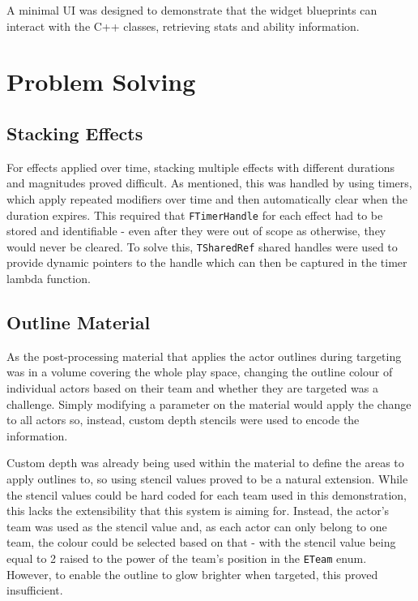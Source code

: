 \documentclass{article}
\begin{document}
A minimal UI was designed to demonstrate that the widget blueprints can interact with the C++ classes, retrieving stats and ability information.

\section{Problem Solving}

\subsection{Stacking Effects}

For effects applied over time, stacking multiple effects with different durations and magnitudes proved difficult. As mentioned, this was handled by using timers, which apply repeated modifiers over time and then automatically clear when the duration expires. This required that \texttt{FTimerHandle} for each effect had to be stored and identifiable - even after they were out of scope as otherwise, they would never be cleared. To solve this, \texttt{TSharedRef} shared handles were used to provide dynamic pointers to the handle which can then be captured in the timer lambda function.

\subsection{Outline Material}

As the post-processing material that applies the actor outlines during targeting was in a volume covering the whole play space, changing the outline colour of individual actors based on their team and whether they are targeted was a challenge. Simply modifying a parameter on the material would apply the change to all actors so, instead, custom depth stencils were used to encode the information.

Custom depth was already being used within the material to define the areas to apply outlines to, so using stencil values proved to be a natural extension. While the stencil values could be hard coded for each team used in this demonstration, this lacks the extensibility that this system is aiming for. Instead, the actor’s team was used as the stencil value and, as each actor can only belong to one team, the colour could be selected based on that - with the stencil value being equal to 2 raised to the power of the team’s position in the \texttt{ETeam} enum. However, to enable the outline to glow brighter when targeted, this proved insufficient. 
\end{document}
